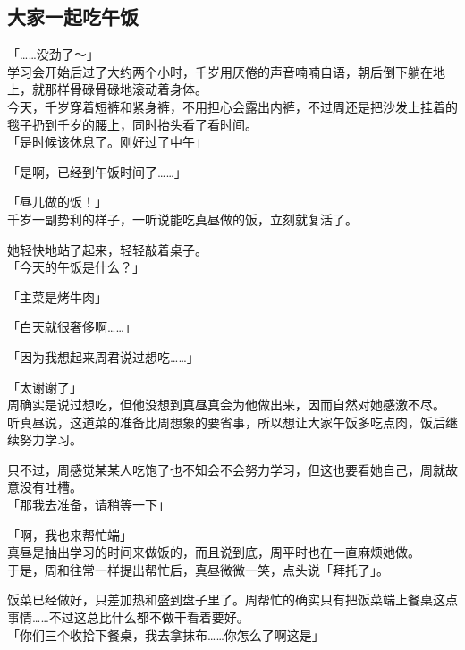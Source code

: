 \subsection{大家一起吃午饭}

「……没劲了～」\\

学习会开始后过了大约两个小时，千岁用厌倦的声音喃喃自语，朝后倒下躺在地上，就那样骨碌骨碌地滚动着身体。\\

今天，千岁穿着短裤和紧身裤，不用担心会露出内裤，不过周还是把沙发上挂着的毯子扔到千岁的腰上，同时抬头看了看时间。\\

「是时候该休息了。刚好过了中午」

「是啊，已经到午饭时间了……」

「昼儿做的饭！」\\

千岁一副势利的样子，一听说能吃真昼做的饭，立刻就复活了。

她轻快地站了起来，轻轻敲着桌子。\\

「今天的午饭是什么？」

「主菜是烤牛肉」

「白天就很奢侈啊……」

「因为我想起来周君说过想吃……」

「太谢谢了」\\

周确实是说过想吃，但他没想到真昼真会为他做出来，因而自然对她感激不尽。\\

听真昼说，这道菜的准备比周想象的要省事，所以想让大家午饭多吃点肉，饭后继续努力学习。

只不过，周感觉某某人吃饱了也不知会不会努力学习，但这也要看她自己，周就故意没有吐槽。\\

「那我去准备，请稍等一下」

「啊，我也来帮忙端」\\

真昼是抽出学习的时间来做饭的，而且说到底，周平时也在一直麻烦她做。\\

于是，周和往常一样提出帮忙后，真昼微微一笑，点头说「拜托了」。

饭菜已经做好，只差加热和盛到盘子里了。周帮忙的确实只有把饭菜端上餐桌这点事情……不过这总比什么都不做干看着要好。\\

「你们三个收拾下餐桌，我去拿抹布……你怎么了啊这是」

